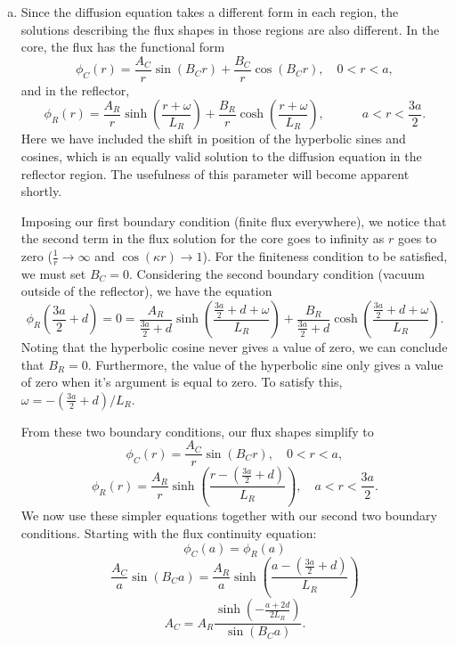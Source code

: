 \documentclass{report}
\begin{document}
\begin{enumerate}[a)]
\item

Since the diffusion equation takes a different form in each region, the solutions describing the flux shapes in those regions are also different. In the core, the flux has the functional form
$$ \phi_C(r) = \frac{A_C}{r} \sin\left(B_C r\right) + \frac{B_C}{r} \cos\left(B_C r\right) , \quad 0 < r < a,$$
and in the reflector,
$$ \phi_R(r) = \frac{A_R}{r}\sinh\left(\frac{r+\omega}{L_R}\right) + \frac{B_R}{r} \cosh\left(\frac{r+\omega}{L_R}\right), \quad\quad\quad a < r < \frac{3a}{2} .$$
Here we have included the shift in position of the hyperbolic sines and cosines, which is an equally valid solution to the diffusion equation in the reflector region. The usefulness of this parameter will become apparent shortly.

Imposing our first boundary condition (finite flux everywhere), we notice that the second term in the flux solution for the core goes to infinity as $r$ goes to zero ($\frac{1}{r} \rightarrow \infty$ and $\cos(\kappa r) \rightarrow 1$). For the finiteness condition to be satisfied, we must set $B_C = 0$. Considering the second boundary condition (vacuum outside of the reflector), we have the equation
$$ \phi_R\left(\frac{3a}{2}+d\right) = 0 = \frac{A_R}{\frac{3a}{2}+d}\sinh\left(\frac{\frac{3a}{2}+d+\omega}{L_R}\right) + \frac{B_R}{\frac{3a}{2}+d} \cosh\left(\frac{\frac{3a}{2}+d+\omega}{L_R}\right) .$$
Noting that the hyperbolic cosine never gives a value of zero, we can conclude that $B_R = 0$.  Furthermore, the value of the hyperbolic sine only gives a value of zero when it's argument is equal to zero. To satisfy this, $\omega = -\left(\frac{3a}{2}+d\right)/L_R$.

From these two boundary conditions, our flux shapes simplify to
$$ \phi_C(r) = \frac{A_C}{r} \sin\left(B_C r\right) , \quad 0 < r < a,$$
$$ \phi_R(r) = \frac{A_R}{r}\sinh\left(\frac{r-\left(\frac{3a}{2}+d\right)}{L_R}\right), \quad a < r < \frac{3a}{2} .$$
We now use these simpler equations together with our second two boundary conditions. Starting with the flux continuity equation:
$$ \phi_C(a) = \phi_R(a) $$
$$ \frac{A_C}{a} \sin\left(B_C a\right) = \frac{A_R}{a}\sinh\left(\frac{a-\left(\frac{3a}{2}+d\right)}{L_R}\right) $$
$$ A_C = A_R \frac{\sinh\left(-\frac{a+2d}{2L_R}\right)}{\sin\left(B_C a\right)} .$$


\end{enumerate}
\end{document}
